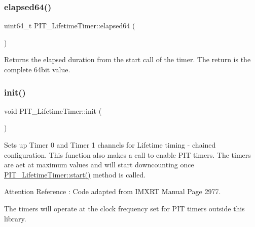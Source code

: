 \subsubsection{\texorpdfstring{elapsed64()}{elapsed64()}}
{\footnotesize\ttfamily uint64\+\_\+t P\+I\+T\+\_\+\+Lifetime\+Timer\+::elapsed64 (\begin{DoxyParamCaption}{ }\end{DoxyParamCaption})\hspace{0.3cm}{\ttfamily [inline]}}



Returns the elapsed duration from the start call of the timer. The return is the complete 64bit value. 

\mbox{\label{classPIT__LifetimeTimer_ad1c585d138123be94769afcca87f2dc6}} 
\subsubsection{\texorpdfstring{init()}{init()}}
{\footnotesize\ttfamily void P\+I\+T\+\_\+\+Lifetime\+Timer\+::init (\begin{DoxyParamCaption}{ }\end{DoxyParamCaption})\hspace{0.3cm}{\ttfamily [inline]}}



Sets up Timer 0 and Timer 1 channels for Lifetime timing -\/ chained configuration. This function also makes a call to enable P\+IT timers. The timers are aet at maximum values and will start downcounting once \hyperlink{classPIT__LifetimeTimer_a6feabeff2529cabaf27ef53d027a4fc9}{P\+I\+T\+\_\+\+Lifetime\+Timer\+::start()} method is called. 

\begin{DoxyAttention}{Attention}
Reference \+: Code adapted from I\+M\+X\+RT Manual Page 2977. 

The timers will operate at the clock frequency set for P\+IT timers outside this library. 
\end{DoxyAttention}
\mbox{\label{classPIT__LifetimeTimer_a39b0861ac88aec5e53f326409d536bcf}} 

